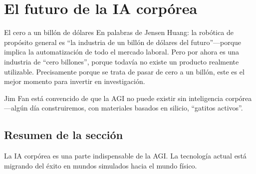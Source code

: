 \section{El futuro de la IA corpórea}

\begin{importantbox}{El cero a un billón de dólares}
En palabras de Jensen Huang: la robótica de propósito general es ``la industria de un billón de dólares del futuro''—porque implica la automatización de todo el mercado laboral. Pero por ahora es una industria de ``cero billones'', porque todavía no existe un producto realmente utilizable. Precisamente porque se trata de pasar de cero a un billón, este es el mejor momento para invertir en investigación.
\end{importantbox}

Jim Fan está convencido de que la AGI no puede existir sin inteligencia corpórea—algún día construiremos, con materiales basados en silicio, ``gatitos activos''.

\subsection{Resumen de la sección}

La IA corpórea es una parte indispensable de la AGI. La tecnología actual está migrando del éxito en mundos simulados hacia el mundo físico.

